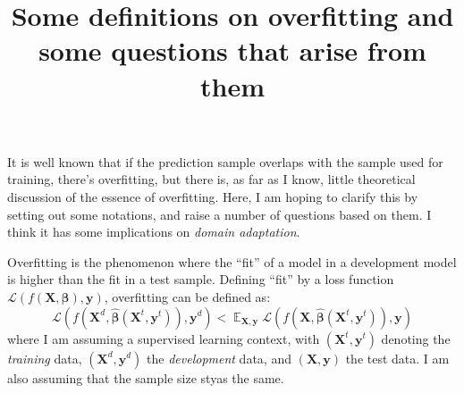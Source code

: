 \documentclass[12pt]{article}
\title{Some definitions on overfitting and some questions that arise from them}
\date{\vspace{-5ex}}
\DeclareMathOperator{\E}{\mathbb{E}}
\begin{document}
	\maketitle
	It is well known that if the prediction sample overlaps with the sample used for training, there's overfitting, but there is, as far as I know, little theoretical discussion of the essence of overfitting. Here, I am hoping to clarify this by setting out some notations, and raise a number of questions based on them. I think it has some implications on \emph{domain adaptation}. 
	
	Overfitting is the phenomenon where the ``fit'' of a model in a development model is higher than the fit in a test sample. Defining ``fit'' by a loss function $\mathcal{L}(f(\boldsymbol{X}, \boldsymbol{\beta}), \boldsymbol{y})$, overfitting can be defined as: 
	\begin{equation}
		\mathcal{L}(f(\boldsymbol{X}^d, \hat{\boldsymbol{\beta}}(\boldsymbol{X}^t, \boldsymbol{y}^t)), \boldsymbol{y}^d) < \E_{\boldsymbol{X}, \boldsymbol{y}} \mathcal{L} (f(\boldsymbol{X}, \hat{\boldsymbol{\beta}}(\boldsymbol{X}^t, \boldsymbol{y}^t)), \boldsymbol{y})
	\end{equation}
	where I am assuming a supervised learning context, with $(\boldsymbol{X}^t, \boldsymbol{y}^t)$ denoting the \emph{training} data, $(\boldsymbol{X}^d, \boldsymbol{y}^d)$ the \emph{development} data, and $(\boldsymbol{X}, \boldsymbol{y})$ the test data. I am also assuming that the sample size styas the same. 
	
\end{document}
